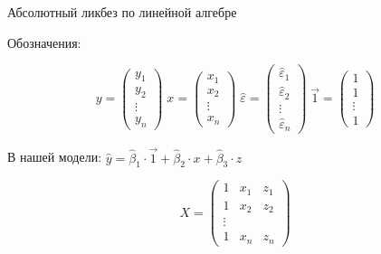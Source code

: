 \documentclass[ignorenonframetext,]{beamer}
\begin{document}
\begin{frame}{Абсолютный ликбез по линейной алгебре}

Обозначения:

\[
y=\begin{pmatrix}
y_1 \\
y_2 \\
\vdots \\
y_n
\end{pmatrix}\;
x=\begin{pmatrix}
x_1 \\
x_2 \\
\vdots \\
x_n
\end{pmatrix}\;
\hat{\varepsilon}=\begin{pmatrix}
\hat{\varepsilon}_1 \\
\hat{\varepsilon}_2 \\
\vdots \\
\hat{\varepsilon}_n
\end{pmatrix}\;
\vec{1}=\begin{pmatrix}
1 \\
1 \\
\vdots \\
1
\end{pmatrix}
\]

В нашей модели:
$\hat{y}=\hat{\beta}_1 \cdot \vec{1}+\hat{\beta}_2 \cdot x +\hat{\beta}_3 \cdot z$

\[
X=\begin{pmatrix}
1 & x_1 & z_1 \\
1 & x_2 & z_2 \\
\vdots \\
1 & x_n & z_n 
\end{pmatrix}
\]

\end{frame}
\end{document}
